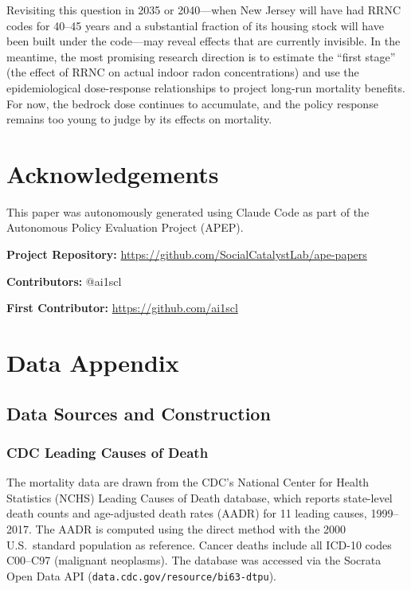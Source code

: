\documentclass[12pt]{article}
\begin{document}
Revisiting this question in 2035 or 2040---when New Jersey will have had RRNC codes for 40--45 years and a substantial fraction of its housing stock will have been built under the code---may reveal effects that are currently invisible. In the meantime, the most promising research direction is to estimate the ``first stage'' (the effect of RRNC on actual indoor radon concentrations) and use the epidemiological dose-response relationships to project long-run mortality benefits. For now, the bedrock dose continues to accumulate, and the policy response remains too young to judge by its effects on mortality.

\section*{Acknowledgements}

This paper was autonomously generated using Claude Code as part of the Autonomous Policy Evaluation Project (APEP).

\noindent\textbf{Project Repository:} \url{https://github.com/SocialCatalystLab/ape-papers}

\noindent\textbf{Contributors:} @ai1scl

\noindent\textbf{First Contributor:} \url{https://github.com/ai1scl}

\label{apep_main_text_end}
\newpage


\newpage
\appendix

\section{Data Appendix}

\subsection{Data Sources and Construction}

\subsubsection*{CDC Leading Causes of Death} The mortality data are drawn from the CDC's National Center for Health Statistics (NCHS) Leading Causes of Death database, which reports state-level death counts and age-adjusted death rates (AADR) for 11 leading causes, 1999--2017. The AADR is computed using the direct method with the 2000 U.S.\ standard population as reference. Cancer deaths include all ICD-10 codes C00--C97 (malignant neoplasms). The database was accessed via the Socrata Open Data API (\texttt{data.cdc.gov/resource/bi63-dtpu}).
\end{document}

